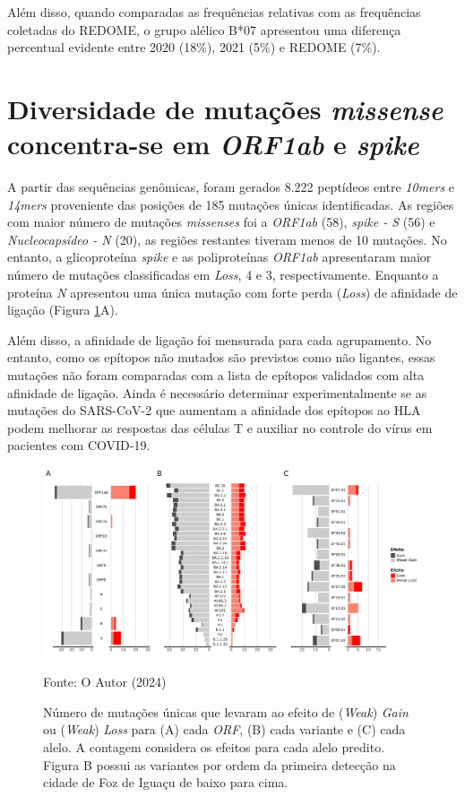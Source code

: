 \begin{justifying}
Além disso, quando comparadas as frequências relativas com as frequências coletadas do REDOME, o grupo alélico B*07 apresentou uma diferença percentual evidente entre 2020 (18\%), 2021 (5\%) e REDOME (7\%).

\section{Diversidade de mutações \textit{missense} concentra-se em \textit{ORF1ab} e \textit{spike}}

A partir das sequências genômicas, foram gerados 8.222 peptídeos entre \textit{10mers} e \textit{14mers} proveniente das posições de 185 mutações únicas identificadas. As regiões com maior número de mutações \textit{missenses} foi a \textit{ORF1ab} (58), \textit{spike - S} (56) e \textit{Nucleocapsídeo - N} (20), as regiões restantes tiveram menos de 10 mutações. No entanto, a glicoproteína \textit{spike} e as poliproteínas \textit{ORF1ab}  apresentaram maior número de mutações classificadas em \textit{Loss}, 4 e 3, respectivamente. Enquanto a proteína \textit{N} apresentou uma única mutação com forte perda (\textit{Loss}) de afinidade de ligação (Figura \ref{fig:fig8}A).

Além disso, a afinidade de ligação foi mensurada para cada agrupamento. No entanto, como os epítopos não mutados são previstos como não ligantes, essas mutações não foram comparadas com a lista de epítopos validados com alta afinidade de ligação. Ainda é necessário determinar experimentalmente se as mutações do SARS-CoV-2 que aumentam a afinidade dos epítopos ao HLA podem melhorar as respostas das células T e auxiliar no controle do vírus em pacientes com COVID-19.

\begin{figure}
    \centering
    \caption{\justifying Número de mutações únicas que levaram ao efeito de (\textit{Weak}) \textit{Gain} ou (\textit{Weak}) \textit{Loss} para (A) cada \textit{ORF}, (B) cada variante e (C) cada alelo. A contagem considera os efeitos para cada alelo predito. Figura B possui as variantes por ordem da primeira detecção na cidade de Foz de Iguaçu de baixo para cima.
}
    \includegraphics[width=1\textwidth, height=0.5\textwidth]{Figuras/fig8.png}
    \label{fig:fig8}
    \begin{minipage}{0.8\textwidth} %
        \centering
        \footnotesize Fonte: O Autor (2024)
    \end{minipage}
\end{figure}


\end{justifying}
